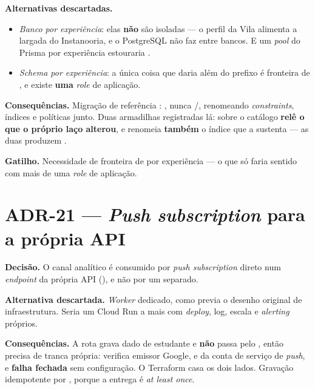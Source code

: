 \textbf{Alternativas descartadas.}
\begin{itemize}
  \item \emph{Banco por experiência}: elas \textbf{não} são isoladas --- o perfil
    da Vila alimenta a largada do Instanooria, e o PostgreSQL não faz 
    entre bancos. E um \emph{pool} do Prisma por experiência estouraria
    .
  \item \emph{\emph{Schema} por experiência}: a única coisa que daria além do
    prefixo é fronteira de , e existe \textbf{uma} \emph{role} de
    aplicação.
\end{itemize}

\textbf{Consequências.} Migração de referência
: , nunca
/, renomeando \emph{constraints}, índices e políticas junto.
Duas armadilhas registradas lá:  sobre o catálogo
\textbf{relê o que o próprio laço alterou}, e  renomeia
\textbf{também} o índice que a sustenta --- as duas produzem
.

\textbf{Gatilho.} Necessidade de fronteira de  por experiência --- o
que só faria sentido com mais de uma \emph{role} de aplicação.

\section{ADR-21 --- \emph{Push subscription} para a própria API}

\textbf{Decisão.} O canal analítico é consumido por \emph{push subscription}
direto num \emph{endpoint} da própria API (), e não
por um  separado.

\textbf{Alternativa descartada.} \emph{Worker} dedicado, como previa o desenho
original de infraestrutura. Seria um Cloud Run a mais com \emph{deploy}, log,
escala e \emph{alerting} próprios.

\textbf{Consequências.} A rota grava dado de estudante e \textbf{não} passa pelo
, então precisa de tranca própria:  verifica
emissor Google,  e  da conta de serviço de \emph{push}, e
\textbf{falha fechada} sem configuração. O Terraform casa os dois lados. Gravação
idempotente por , porque a entrega é \emph{at least once}.

